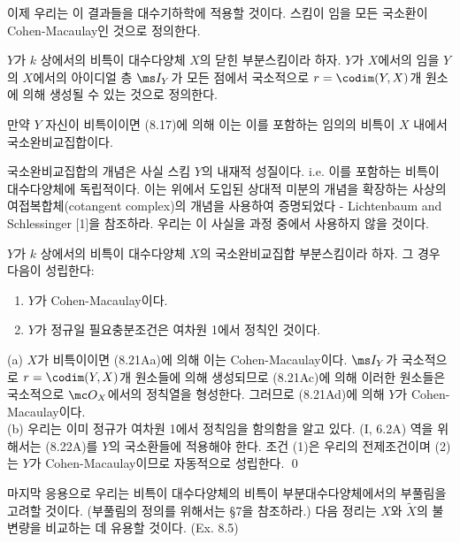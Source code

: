 	이제 우리는 이 결과들을 대수기하학에 적용할 것이다. 스킴이 임을 모든 국소환이 Cohen-Macaulay인 것으로 정의한다.
	
	
	\begin{definition}
	$Y$가 $k$ 상에서의 비특이 대수다양체 $X$의 닫힌 부분스킴이라 하자.
	$Y$가 $X$에서의 임을
	$Y$의 $X$에서의 아이디얼 층 $\ms I_Y$가 모든 점에서 국소적으로 $r=\codim(Y,X)$개 원소에 의해 생성될 수 있는 것으로 정의한다.
	\end{definition}
	
	
	\begin{example}
	만약 $Y$ 자신이 비특이이면 (8.17)에 의해 이는 이를 포함하는 임의의 비특이 $X$ 내에서 국소완비교집합이다.
	\end{example}
	
	
	\begin{remark}
	국소완비교집합의 개념은 사실 스킴 $Y$의 내재적 성질이다. i.e. 이를 포함하는 비특이 대수다양체에 독립적이다.
	이는 위에서 도입된 상대적 미분의 개념을 확장하는 사상의 여접복합체(cotangent complex)의 개념을 사용하여 증명되었다 -
	Lichtenbaum and Schlessinger [1]을 참조하라. 우리는 이 사실을 과정 중에서 사용하지 않을 것이다.
	\end{remark}
	
	
	\begin{proposition}
	$Y$가 $k$ 상에서의 비특이 대수다양체 $X$의 국소완비교집합 부분스킴이라 하자. 그 경우 다음이 성립한다:
	\begin{enumerate}[label=(\alph*)]
	\item $Y$가 Cohen-Macaulay이다.
	\item $Y$가 정규일 필요충분조건은 여차원 1에서 정칙인 것이다.\\
	\end{enumerate}
	\pf (a) $X$가 비특이이면 (8.21Aa)에 의해 이는 Cohen-Macaulay이다.
	$\ms I_Y$가 국소적으로 $r=\codim(Y,X)$개 원소들에 의해 생성되므로
	(8.21Ac)에 의해 이러한 원소들은 국소적으로 $\mc O_X$에서의 정칙열을 형성한다.
	그러므로 (8.21Ad)에 의해 $Y$가 Cohen-Macaulay이다.\\
	(b) 우리는 이미 정규가 여차원 1에서 정칙임을 함의함을 알고 있다. (I, 6.2A)
	역을 위해서는 (8.22A)를  $Y$의 국소환들에 적용해야 한다.
	조건 (1)은 우리의 전제조건이며 (2)는 $Y$가 Cohen-Macaulay이므로 자동적으로 성립한다.
	\qed
	\end{proposition}
	
	마지막 응용으로 우리는 비특이 대수다양체의 비특이 부분대수다양체에서의 부풀림을 고려할 것이다. (부풀림의 정의를 위해서는 \S 7을 참조하라.)
	다음 정리는 $X$와 $\tilde X$의 불변량을 비교하는 데 유용할 것이다. (Ex. 8.5)
	

